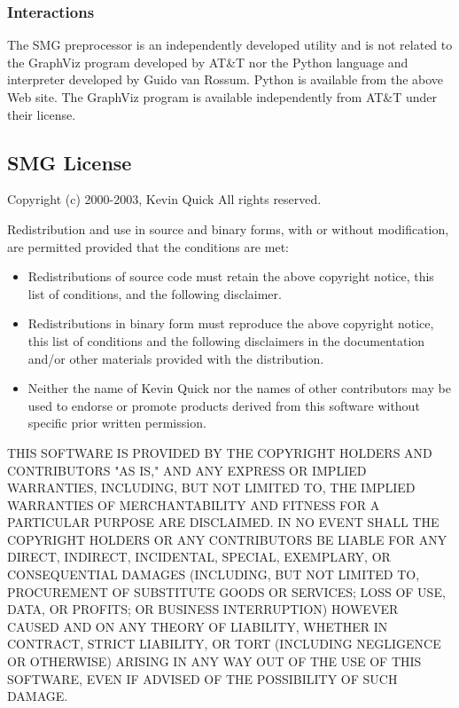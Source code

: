 \subsubsection{Interactions}

The SMG preprocessor is an independently developed utility and is not
related to the GraphViz program developed by AT\&T nor the Python
language and interpreter developed by Guido van Rossum.  Python is
available from the above Web site.  The GraphViz program is available
independently from AT\&T under their license.


\subsection{SMG License}

Copyright (c) 2000-2003, Kevin Quick
All rights reserved.

Redistribution and use in source and binary forms, with or without
modification, are permitted provided that the conditions are met:

\begin{itemize}

\item Redistributions of source code must retain the above copyright
  notice, this list of conditions, and the following disclaimer.

\item Redistributions in binary form must reproduce the above copyright
  notice, this list of conditions and the following disclaimers in the
  documentation and/or other materials provided with the distribution.

\item Neither the name of Kevin Quick nor the names of other contributors may
  be used to endorse or promote products derived from this software
  without specific prior written permission.

\end{itemize}

THIS SOFTWARE IS PROVIDED BY THE COPYRIGHT HOLDERS AND CONTRIBUTORS
"AS IS," AND ANY EXPRESS OR IMPLIED WARRANTIES, INCLUDING, BUT NOT
LIMITED TO, THE IMPLIED WARRANTIES OF MERCHANTABILITY AND FITNESS FOR
A PARTICULAR PURPOSE ARE DISCLAIMED.  IN NO EVENT SHALL THE COPYRIGHT
HOLDERS OR ANY CONTRIBUTORS BE LIABLE FOR ANY DIRECT, INDIRECT,
INCIDENTAL, SPECIAL, EXEMPLARY, OR CONSEQUENTIAL DAMAGES (INCLUDING,
BUT NOT LIMITED TO, PROCUREMENT OF SUBSTITUTE GOODS OR SERVICES; LOSS
OF USE, DATA, OR PROFITS; OR BUSINESS INTERRUPTION) HOWEVER CAUSED AND
ON ANY THEORY OF LIABILITY, WHETHER IN CONTRACT, STRICT LIABILITY, OR
TORT (INCLUDING NEGLIGENCE OR OTHERWISE) ARISING IN ANY WAY OUT OF THE
USE OF THIS SOFTWARE, EVEN IF ADVISED OF THE POSSIBILITY OF SUCH
DAMAGE.


